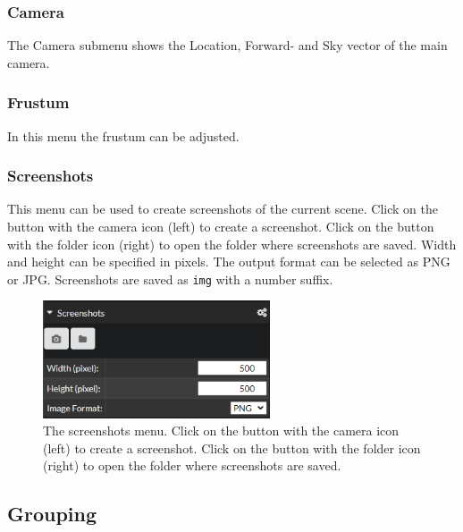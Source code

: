 \subsubsection{Camera} 

The Camera submenu shows the Location, Forward- and Sky vector of the main camera.


\subsubsection{Frustum}

In this menu the frustum can be adjusted.

\subsubsection{Screenshots}

This menu can be used to create screenshots of the current scene. Click on the button with the camera icon (left) to create a screenshot. Click on the button with the folder icon (right) to open the folder where screenshots are saved. Width and height can be specified in pixels. The output format can be selected as PNG or JPG. Screenshots are saved as \texttt{img} with a number suffix. 

\begin{figure}[h]
	\centering
	\includegraphics[width=0.6\textwidth]{pics/screenshots.PNG}
	\caption[View Planner]{The screenshots menu. Click on the button with the camera icon (left) to create a screenshot. Click on the button with the folder icon (right) to open the folder where screenshots are saved.}
	\label{fig:screenshots}
\end{figure}



\subsection{Grouping}
\label{sec:grouping}

